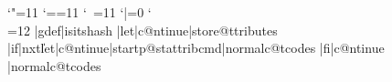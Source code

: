 \def\oddc@tcodes{\catcode`"=11 \catcode`==11 \catcode`\ =11 \catcode`|=0
\catcode`\\=12}                                                                                 
\def\normalc@tcodes{\catcode`"=12 \catcode`==12 \catcode`\ =10\catcode`\\=0
\catcode`\|=12}                                                                              

\def\start@ttributegrab{\let\c@ntinue\isitshash\oddc@tcodes\futurelet\nxt\c@ntinue}
\def\end@ttributegrab{%
  \xdef\@ttributes{\x@\detokenize\x@{\@ttributes}}%
  \message{Now executing \p@stattribcmd}%
  \csname\p@stattribcmd\endcsname}

\oddc@tcodes
|gdef|isitshash{%
|let|c@ntinue|store@ttributes%
|if|nxt\|let|c@ntinue|startp@stattribcmd|normalc@tcodes%
|fi|c@ntinue}
|normalc@tcodes

%
%

